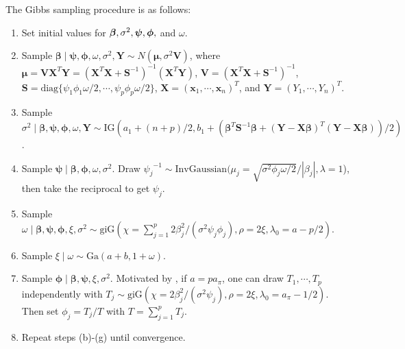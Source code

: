 \documentclass[12pt]{article}
\newcommand{\greekbold}[1]{\mbox{\boldmath $#1$}}
\newcommand{\betabf}{\greekbold{\beta}}
\begin{document}
The Gibbs sampling procedure is as follows:
\begin{enumerate}[label=(\alph*)]
	 \item Set initial values for  $\betabf, \sigma^2, \bm{\psi},\bm{\phi},$ and $\omega$.
	 \item Sample
	$\bm\beta \mid \bm{\psi},\bm{\phi} ,\omega,   \sigma^2, {\bm Y} \sim N(\bm\mu,\sigma^2 {\bm V})$, where $ \bm\mu ={\bm V} \bm{X}^T\bm{Y} = (\bm{X}^T\bm{X}+{\bm S}^{-1})^{-1} (\bm{X}^T\bm{Y})$,   $ {\bm V} = ( \bm{X}^T\bm{X} +{\bm S}^{-1})^{-1} $,   ${\bm S} = \text{diag}\{ \psi_1\phi_1\omega/2, \cdots, \psi_p\phi_p\omega/2 \}$,  $\bm{X} = (\bm{x}_1,\cdots, \bm{x}_n)^T$, and $\bm{Y} = (Y_1, \cdots, Y_n)^T$.


	\item  Sample $\sigma^2 \mid  \bm\beta,\bm{\psi}, \bm{\phi},\omega,{\bm Y}  \sim \text{IG}(a_1+  (n+p)/{2}, b_1 + ( \bm\beta^T {\bm S}^{-1}\bm\beta  +(\bm{Y}-\bm{X}\bm\beta)^T  (\bm{Y}-\bm{X}\bm\beta) )/{2})$.


	\item Sample $\bm{\psi}\mid \bm\beta, \bm{\phi},\omega, \sigma^2$. Draw $ {\psi_j}^{-1}\sim \text{InvGaussian}(\mu_j =   {\sqrt{\sigma^2\phi_j \omega/2}}/{|\beta_j| }, \lambda=1 $), then take the reciprocal to get $\psi_j$.

	\item Sample $\omega\mid \bm\beta, \bm{\psi},\bm{\phi},  \xi, \sigma^2 \sim \text{giG}(\chi = \sum\limits_{j=1}^p {2\beta_j^2} /(\sigma^2\psi_j\phi_j), \rho = 2\xi, \lambda_0 = a-p/2)$.
	\item Sample $\xi \mid \omega \sim \text{Ga}(a+b, 1+ \omega)$.

	\item Sample $\bm\phi\mid \bm\beta,\bm\psi,  \xi, \sigma^2$.
	Motivated by \cite{bhattacharya2015dirichlet}, if  $a = pa_\pi$, one can draw $T_1, \cdots, T_p$ independently with  $T_j\sim \text{giG} (\chi = {2\beta_j^2}/(\sigma^2\psi_j), \rho = 2\xi, \lambda_0 = a_\pi-1/2)$. Then set $\phi_j = T_j/T$ with $T=\sum\limits_{j=1}^p T_j$.
	 \item Repeat steps (b)-(g) until convergence.
\end{enumerate}
\end{document}
